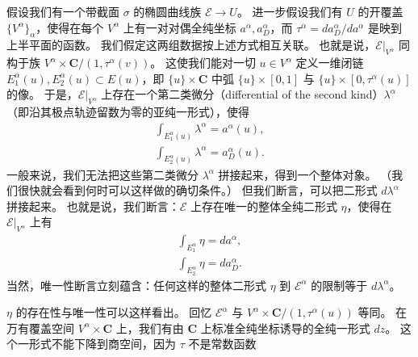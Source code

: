 假设我们有一个带截面 $\sigma$ 的椭圆曲线族 $\mathcal{E}\to U$。
进一步假设我们有 $U$ 的开覆盖 $\{V^\alpha\}_\alpha$，使得在每个 $V^\alpha$ 上有一对对偶全纯坐标 $a^\alpha,a_D^\alpha$，而 $\tau^\alpha=da_D^\alpha/da^\alpha$ 是映到上半平面的函数。
我们假定这两组数据按上述方式相互关联。
也就是说，$\mathcal{E}|_{V^\alpha}$ 同构于族 $V^\alpha\times\mathbf{C}/(1,\tau^\alpha(v))$。
这使我们能对一切 $u\in V^\alpha$ 定义一维闭链 $E_1^\alpha(u),E_2^\alpha(u)\subset E(u)$，即 $\{u\}\times\mathbf{C}$ 中弧 $\{u\}\times[0,1]$ 与 $\{u\}\times[0,\tau^\alpha(u)]$ 的像。
于是，$\mathcal{E}|_{V^\alpha}$ 上存在一个第二类微分（differential of the second kind）$\lambda^\alpha$（即沿其极点轨迹留数为零的亚纯一形式），使得
\[
\begin{gathered}
\int_{E_1^\alpha(u)}\lambda^\alpha=a^\alpha(u),\\[2pt]
\int_{E_2^\alpha(u)}\lambda^\alpha=a_D^\alpha(u).
\end{gathered}
\]
一般来说，我们无法把这些第二类微分 $\lambda^\alpha$ 拼接起来，得到一个整体对象。
（我们很快就会看到何时可以这样做的确切条件。）
但我们断言，可以把二形式 $d\lambda^\alpha$ 拼接起来。
也就是说，我们断言：$\mathcal{E}$ 上存在唯一的整体全纯二形式 $\eta$，使得在 $\mathcal{E}|_{V^\alpha}$ 上有
\[
\begin{gathered}
\int_{E_1^\alpha}\eta=da^\alpha,\\[2pt]
\int_{E_2^\alpha}\eta=da_D^\alpha.
\end{gathered}
\]
当然，唯一性断言立刻蕴含：任何这样的整体二形式 $\eta$ 到 $\mathcal{E}^\alpha$ 的限制等于 $d\lambda^\alpha$。


$\eta$ 的存在性与唯一性可以这样看出。
回忆 $\mathcal{E}^\alpha$ 与 $V^\alpha\times\mathbf{C}/(1,\tau^\alpha(u))$ 等同。
在万有覆盖空间 $V^\alpha\times\mathbf{C}$ 上，我们有由 $\mathbf{C}$ 上标准全纯坐标诱导的全纯一形式 $dz$。
这个一形式不能下降到商空间，因为 $\tau$ 不是常数函数

